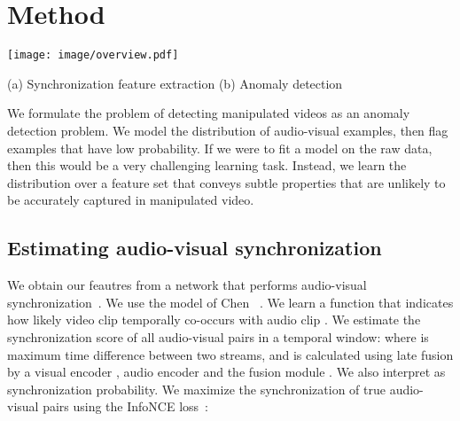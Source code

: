\documentclass[10pt,twocolumn,letterpaper]{article}
\def\upvspacefig{\vspace{-0.0mm}}
\begin{document}
 
 
\section{Method}
\begin{figure*}[t!]
    \centering
    \upvspacefig
    \texttt{[image: image/overview.pdf]}
    \begin{flushleft}
        \vspace{-3mm}
        \hspace{6mm} (a) Synchronization feature extraction \hspace{45mm} (b) Anomaly detection
         \vspace{-3mm}
    \end{flushleft}    
    \caption{\textbf{Audio-visual anomaly detection model.}
    (a) We extract a feature set from an audio-visual synchronization network: the number of frames of delay between video frames and sound, the distribution over delays at each frame, and feature activations from the audio and visual subnetworks. (b) We train an autoregressive Transformer model to assign probabilities to synchronization features. At test time, we flag low probability examples.}
    \label{model_overview}
\end{figure*} \label{sec:method}



We formulate the problem of detecting manipulated videos as an anomaly detection problem. We model the distribution of audio-visual examples, then flag examples that have low probability. If we were to fit a model on the raw data, then this would be a very challenging learning task. Instead, we learn the distribution over a feature set that conveys subtle properties that are unlikely to be accurately captured in manipulated video. 





\subsection{Estimating audio-visual synchronization}\label{sync_estimate}





We obtain our feautres from a network that performs audio-visual synchronization~\cite{chung2019perfect,chung2016out,owens2018audio,chen2021audio}. We use the model of Chen \etal~\cite{chen2021audio}. We learn a function  that indicates how likely video clip  temporally co-occurs with audio clip . We estimate the synchronization score  of all audio-visual pairs in a temporal window: 
where  is maximum time difference between two streams, and  is calculated using late fusion by a visual encoder , audio encoder  and the fusion module . We also interpret  as synchronization probability. We maximize the synchronization of true audio-visual pairs  using the InfoNCE loss~\cite{oord2018representation}: 
\end{document}
